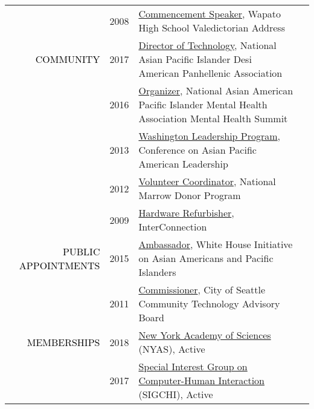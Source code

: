 \documentclass[12pt]{article}
\begin{document}
{{\begin{longtable}{Rp{1.0in}p{0.25in}p{4.75in}}
& \footnotesize{2008} & \href{https://youtu.be/5gt7nFRgkac}{{Commencement Speaker}}, Wapato High School Valedictorian Address \\

\textcolor{black}{\footnotesize{\uppercase{Community}}} & \footnotesize{2017} & \href{http://www.napahq.org/}{{Director of Technology}}, National Asian Pacific Islander Desi American Panhellenic Association \\

& \footnotesize{2016} & \href{https://www.facebook.com/events/215634702135825/}{{Organizer}}, National Asian American Pacific Islander Mental Health Association Mental Health Summit \\

& \footnotesize{2013} & \href{https://www.capal.org/programs/wlp/}{{Washington Leadership Program}}, Conference on Asian Pacific American Leadership \\

& \footnotesize{2012} & \href{http://www.dailyuw.com/news/article_de3524ce-3d5e-5dd2-8de7-5deebee463d9.html}{{Volunteer Coordinator}}, National Marrow Donor Program \\

& \footnotesize{2009} & \href{http://www.washington.edu/news/2010/04/22/student-service-and-leadership-to-be-celebrated-april-28/}{{Hardware Refurbisher}}, InterConnection \\

\textcolor{black}{\footnotesize{\uppercase{Public Appointments}}} & \footnotesize{2015} & \href{https://sites.ed.gov/aapi/e3-ambassadors/}{{Ambassador}}, White House Initiative on Asian Americans and Pacific Islanders \\

& \footnotesize{2011} & \href{https://web.archive.org/web/20150911093548/https://ischool.uw.edu/alumni/impact-stories/informatics-grad-and-husky-promise-student-aims-deliver-it-resources}{{Commissioner}}, City of Seattle Community Technology Advisory Board \\

\textcolor{black}{\footnotesize{\uppercase{Memberships}}} & \footnotesize{2018} & \href{https://www.nyas.org/}{{New York Academy of Sciences}} (NYAS), Active \\

 & \footnotesize{2017} & \href{https://www.sigchi.org/}{{Special Interest Group on Computer-Human Interaction}} (SIGCHI), Active \\


\end{longtable}}}
\end{document}
